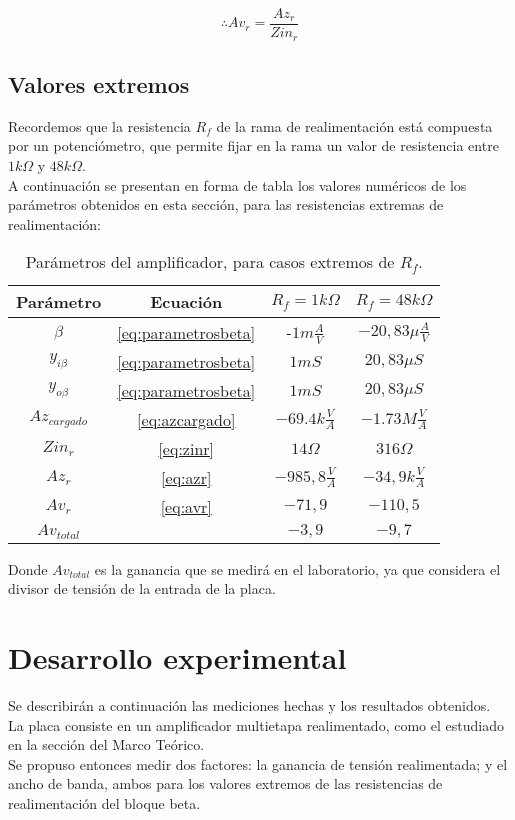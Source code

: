 \documentclass[letterpaper, 10 pt, conference]{ieeeconf}  %
\begin{document}
\begin{equation}
\therefore Av_r = \frac{Az_r}{Zin_r}
\label{eq:avr}
\end{equation}

\subsection{\textbf{Valores extremos}}
Recordemos que la resistencia $R_f$ de la rama de realimentación está compuesta por un potenciómetro, que permite fijar en la rama un valor de resistencia entre $1k\Omega$ y $48k\Omega$.\\
A continuación se presentan en forma de tabla los valores numéricos de los parámetros obtenidos en esta sección, para las resistencias extremas de realimentación:


\begin{table}[h]
\begin{center}
\begin{tabular}{|c||c|c|c|}
\hline
Parámetro & Ecuación & $R_f = 1k\Omega$ & $R_f = 48k\Omega$\\
\hline
$\beta$ & \ref{eq:parametrosbeta} & -$1m \frac{A}{V}$ & $-20,83\mu \frac{A}{V}$\\
\hline
$y_{i\beta}$ & \ref{eq:parametrosbeta} & $1 mS$ & $20,83\mu S$\\
\hline
$y_{o\beta}$ & \ref{eq:parametrosbeta} & $1 mS$ & $20,83\mu S$\\
\hline
$Az_{cargado}$ & \ref{eq:azcargado} & $-69.
4k\frac{V}{A}$ & $-1.73M\frac{V}{A}$\\
\hline
$Zin_r$ & \ref{eq:zinr} & $14\Omega$ & $316\Omega$\\
\hline
$Az_r$ & \ref{eq:azr} & $-985,8 \frac{V}{A}$ & $-34,9k\frac{V}{A}$\\
\hline
$Av_r$ & \ref{eq:avr} & $-71,9$ & $-110,5$\\
\hline
$Av_{total}$ &  & $-3,9$ & $-9,7$\\
\hline
\end{tabular}
\end{center}
\caption{Parámetros del amplificador, para casos extremos de $R_f$.}
\label{tab:parametros}
\end{table}

Donde $Av_{total}$ es la ganancia que se medirá en el laboratorio, ya que considera el divisor de tensión de la entrada de la placa.

\section{Desarrollo experimental}
Se describirán a continuación las mediciones hechas y los resultados obtenidos.\\
La placa consiste en un amplificador multietapa realimentado, como el estudiado en la sección del Marco Teórico.\\
Se propuso entonces medir dos factores: la ganancia de tensión realimentada; y el ancho de banda, ambos para los valores extremos de las resistencias de realimentación del bloque beta.
\end{document}
